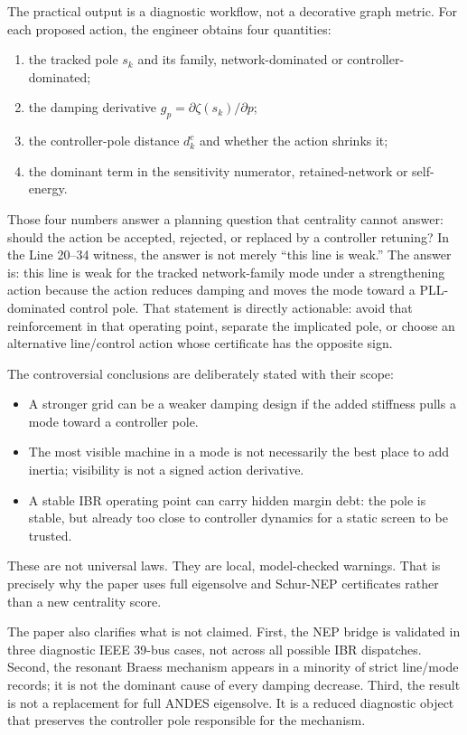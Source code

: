 \documentclass[conference]{IEEEtran}
\begin{document}
The practical output is a diagnostic workflow, not a decorative graph metric.
For each proposed action, the engineer obtains four quantities:
\begin{enumerate}
\item the tracked pole $s_k$ and its family, network-dominated or
controller-dominated;
\item the damping derivative $g_p=\partial\zeta(s_k)/\partial p$;
\item the controller-pole distance $d_k^c$ and whether the action shrinks it;
\item the dominant term in the sensitivity numerator, retained-network or
self-energy.
\end{enumerate}
Those four numbers answer a planning question that centrality cannot answer:
should the action be accepted, rejected, or replaced by a controller retuning?
In the Line 20--34 witness, the answer is not merely ``this line is weak.'' The
answer is: this line is weak for the tracked network-family mode under a
strengthening action because the action reduces damping and moves the mode
toward a PLL-dominated control pole. That statement is directly actionable:
avoid that reinforcement in that operating point, separate the implicated pole,
or choose an alternative line/control action whose certificate has the opposite
sign.

The controversial conclusions are deliberately stated with their scope:
\begin{itemize}
\item A stronger grid can be a weaker damping design if the added stiffness
pulls a mode toward a controller pole.
\item The most visible machine in a mode is not necessarily the best place to
add inertia; visibility is not a signed action derivative.
\item A stable IBR operating point can carry hidden margin debt: the pole is
stable, but already too close to controller dynamics for a static screen to be
trusted.
\end{itemize}
These are not universal laws. They are local, model-checked warnings. That is
precisely why the paper uses full eigensolve and Schur-NEP certificates rather
than a new centrality score.

The paper also clarifies what is not claimed. First, the NEP bridge is validated in three diagnostic IEEE 39-bus cases, not across all possible IBR dispatches. Second, the resonant Braess mechanism appears in a minority of strict line/mode records; it is not the dominant cause of every damping decrease. Third, the result is not a replacement for full ANDES eigensolve. It is a reduced diagnostic object that preserves the controller pole responsible for the mechanism.
\end{document}
